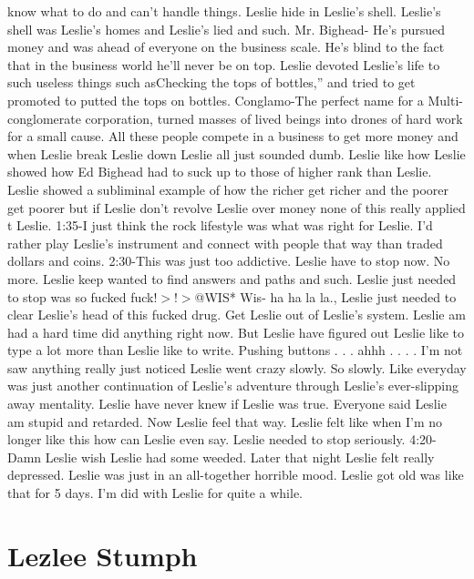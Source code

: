 \documentclass[12pt]{book}
\begin{document}
know what to do and can't handle things. Leslie hide in Leslie's shell. Leslie's shell was Leslie's homes and Leslie's lied and such. Mr. Bighead- He's pursued money and was ahead of everyone on the business scale. He's blind to the fact that in the business world he'll never be on top. Leslie devoted Leslie's life to such useless things such asChecking the tops of bottles,'' and tried to get promoted to putted the tops on bottles. Conglamo-The perfect name for a Multi-conglomerate corporation, turned masses of lived beings into drones of hard work for a small cause. All these people compete in a business to get more money and when Leslie break Leslie down Leslie all just sounded dumb. Leslie like how Leslie showed how Ed Bighead had to suck up to those of higher rank than Leslie. Leslie showed a subliminal example of how the richer get richer and the poorer get poorer but if Leslie don't revolve Leslie over money none of this really applied t Leslie. 1:35-I just think the rock lifestyle was what was right for Leslie. I'd rather play Leslie's instrument and connect with people that way than traded dollars and coins. 2:30-This was just too addictive. Leslie have to stop now. No more. Leslie keep wanted to find answers and paths and such. Leslie just needed to stop was so fucked fuck!$>$!$>$@WIS* Wis- ha ha la la., Leslie just needed to clear Leslie's head of this fucked drug. Get Leslie out of Leslie's system. Leslie am had a hard time did anything right now. But Leslie have figured out Leslie like to type a lot more than Leslie like to write. Pushing buttons . . .  ahhh . . . . I'm not saw anything really just noticed Leslie went crazy slowly. So slowly. Like everyday was just another continuation of Leslie's adventure through Leslie's ever-slipping away mentality. Leslie have never knew if Leslie was true. Everyone said Leslie am stupid and retarded. Now Leslie feel that way. Leslie felt like when I'm no longer like this how can Leslie even say. Leslie needed to stop seriously. 4:20-Damn Leslie wish Leslie had some weeded. Later that night Leslie felt really depressed. Leslie was just in an all-together horrible mood. Leslie got old was like that for 5 days. I'm did with Leslie for quite a while.



\chapter{Lezlee Stumph}
\end{document}
